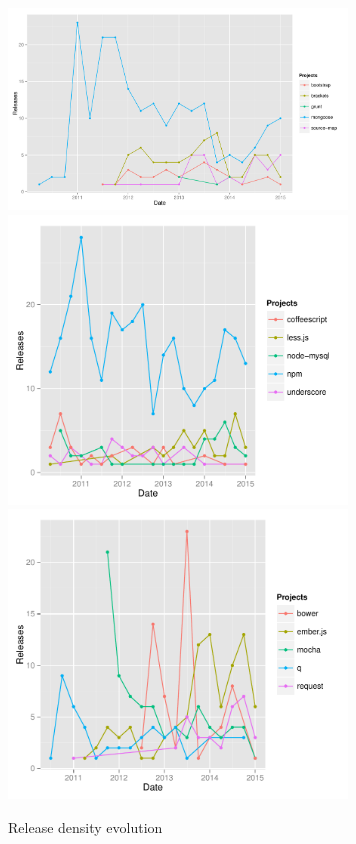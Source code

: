 \begin{figure}[thb!]
	\caption{Release density evolution}
	\label{fig:release_density}
	\includegraphics[width=90mm,scale=0.5]{figures/release_density}
	\includegraphics[width=90mm,scale=0.5]{figures/release_density_2}
	\includegraphics[width=90mm,scale=0.5]{figures/release_density_3}
\end{figure}


